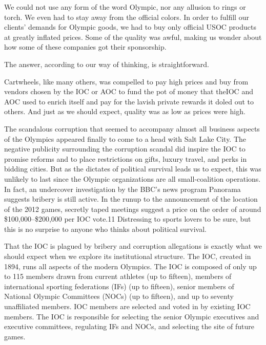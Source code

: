 \documentclass[10pt]{article}
\begin{document}
{\large We could not use any form of the word Olympic, nor any allusion to rings
or torch. We even had to stay away from the official colors. In order to fulfill
our clients' demands for Olympic goods, we had to buy only official USOC products
at greatly inflated prices. Some of the quality was awful, making us wonder about
how some of these companies got their sponsorship.}

{\large The answer, according to our way of thinking, is straightforward.}

{\large Cartwheels, like many others, was compelled to pay high prices and buy
from vendors chosen by the IOC or AOC to fund the pot of money that theIOC and
AOC used to enrich itself and pay for the lavish private rewards it doled out to
others. And just as we should expect, quality was as low as prices were high.}

{\large The scandalous corruption that seemed to accompany almost all business
aspects of the Olympics appeared finally to come to a head with Salt Lake City.
The negative publicity surrounding the corruption scandal did inspire the IOC to
promise reforms and to place restrictions on gifts, luxury travel, and perks in
bidding cities. But as the dictates of political survival leads us to expect,
this was unlikely to last since the Olympic organizations are all small-coalition
operations. In fact, an undercover investigation by the BBC's news program
Panorama suggests bribery is still active. In the runup to the announcement of
the location of the 2012 games, secretly taped meetings suggest a price on the
order of around \$100,000--\$200,000 per IOC vote.11 Distressing to sports lovers
to be sure, but this is no surprise to anyone who thinks about political
survival.}

{\large That the IOC is plagued by bribery and corruption allegations is exactly
what we should expect when we explore its institutional structure. The IOC,
created in 1894, runs all aspects of the modern Olympics. The IOC is composed of
only up to 115 members drawn from current athletes (up to fifteen), members of
international sporting federations (IFs) (up to fifteen), senior members of
National Olympic Committees (NOCs) (up to fifteen), and up to seventy
unaffiliated members. IOC members are selected and voted in by existing IOC
members. The IOC is responsible for selecting the senior Olympic executives and
executive committees, regulating IFs and NOCs, and selecting the site of future
games.}
\end{document}
